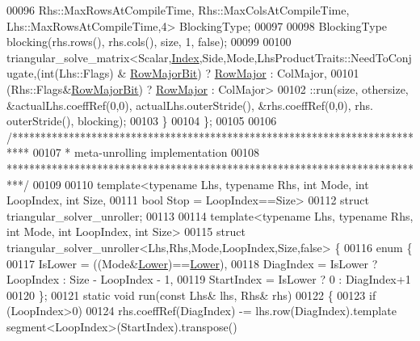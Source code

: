 \begin{DoxyCode}
00096               Rhs::MaxRowsAtCompileTime, Rhs::MaxColsAtCompileTime, Lhs::MaxRowsAtCompileTime,4> 
      BlockingType;
00097 
00098     BlockingType blocking(rhs.rows(), rhs.cols(), size, 1, \textcolor{keyword}{false});
00099 
00100     triangular\_solve\_matrix<Scalar,\hyperlink{namespace_eigen_a62e77e0933482dafde8fe197d9a2cfde}{Index},Side,Mode,LhsProductTraits::NeedToConjugate,(int(Lhs::Flags) 
      & \hyperlink{group__flags_gae4f56c2a60bbe4bd2e44c5b19cbe8762}{RowMajorBit}) ? \hyperlink{group__enums_ggaacded1a18ae58b0f554751f6cdf9eb13acfcde9cd8677c5f7caf6bd603666aae3}{RowMajor} : ColMajor,
00101                                (Rhs::Flags&\hyperlink{group__flags_gae4f56c2a60bbe4bd2e44c5b19cbe8762}{RowMajorBit}) ? \hyperlink{group__enums_ggaacded1a18ae58b0f554751f6cdf9eb13acfcde9cd8677c5f7caf6bd603666aae3}{RowMajor} : ColMajor>
00102       ::run(size, othersize, &actualLhs.coeffRef(0,0), actualLhs.outerStride(), &rhs.coeffRef(0,0), rhs.
      outerStride(), blocking);
00103   \}
00104 \};
00105 
00106 \textcolor{comment}{/***************************************************************************}
00107 \textcolor{comment}{* meta-unrolling implementation}
00108 \textcolor{comment}{***************************************************************************/}
00109 
00110 \textcolor{keyword}{template}<\textcolor{keyword}{typename} Lhs, \textcolor{keyword}{typename} Rhs, \textcolor{keywordtype}{int} Mode, \textcolor{keywordtype}{int} LoopIndex, \textcolor{keywordtype}{int} Size,
00111          \textcolor{keywordtype}{bool} Stop = LoopIndex==Size>
00112 \textcolor{keyword}{struct }triangular\_solver\_unroller;
00113 
00114 \textcolor{keyword}{template}<\textcolor{keyword}{typename} Lhs, \textcolor{keyword}{typename} Rhs, \textcolor{keywordtype}{int} Mode, \textcolor{keywordtype}{int} LoopIndex, \textcolor{keywordtype}{int} Size>
00115 \textcolor{keyword}{struct }triangular\_solver\_unroller<Lhs,Rhs,Mode,LoopIndex,Size,false> \{
00116   \textcolor{keyword}{enum} \{
00117     IsLower = ((Mode&\hyperlink{group__enums_gga39e3366ff5554d731e7dc8bb642f83cda891792b8ed394f7607ab16dd716f60e6}{Lower})==\hyperlink{group__enums_gga39e3366ff5554d731e7dc8bb642f83cda891792b8ed394f7607ab16dd716f60e6}{Lower}),
00118     DiagIndex  = IsLower ? LoopIndex : Size - LoopIndex - 1,
00119     StartIndex = IsLower ? 0         : DiagIndex+1
00120   \};
00121   \textcolor{keyword}{static} \textcolor{keywordtype}{void} run(\textcolor{keyword}{const} Lhs& lhs, Rhs& rhs)
00122   \{
00123     \textcolor{keywordflow}{if} (LoopIndex>0)
00124       rhs.coeffRef(DiagIndex) -= lhs.row(DiagIndex).template segment<LoopIndex>(StartIndex).transpose()

\end{DoxyCode}
